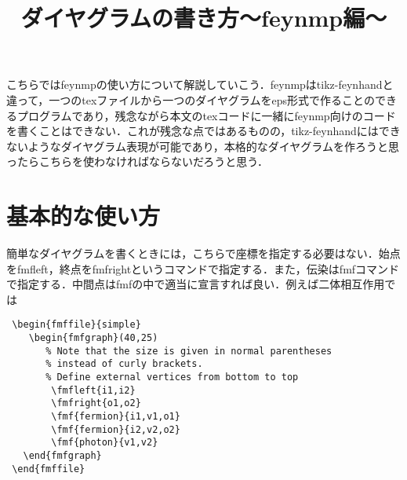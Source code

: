 \documentclass[a4j]{jarticle}
\title{ダイヤグラムの書き方〜feynmp編〜}
\begin{document}
こちらではfeynmpの使い方について解説していこう．feynmpはtikz-feynhandと違って，一つのtexファイルから一つのダイヤグラムをeps形式で作ることのできるプログラムであり，残念ながら本文のtexコードに一緒にfeynmp向けのコードを書くことはできない．これが残念な点ではあるものの，tikz-feynhandにはできないようなダイヤグラム表現が可能であり，本格的なダイヤグラムを作ろうと思ったらこちらを使わなければならないだろうと思う．

\section{基本的な使い方}
簡単なダイヤグラムを書くときには，こちらで座標を指定する必要はない．始点をfmfleft，終点をfmfrightというコマンドで指定する．また，伝染はfmfコマンドで指定する．中間点はfmfの中で適当に宣言すれば良い．例えば二体相互作用では
\begin{lstlisting}
 \begin{fmffile}{simple}
    \begin{fmfgraph}(40,25)
       % Note that the size is given in normal parentheses
       % instead of curly brackets.
       % Define external vertices from bottom to top
        \fmfleft{i1,i2}
        \fmfright{o1,o2}
        \fmf{fermion}{i1,v1,o1}
        \fmf{fermion}{i2,v2,o2}
        \fmf{photon}{v1,v2}
   \end{fmfgraph}
 \end{fmffile}
\end{lstlisting}
\end{document}
